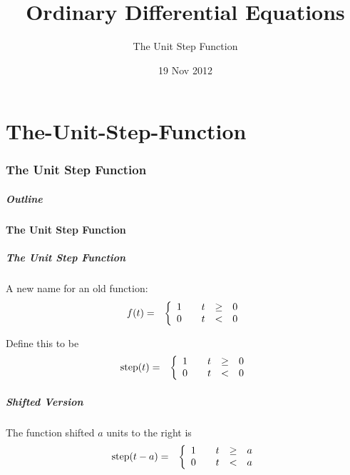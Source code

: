 \part{The-Unit-Step-Function}
\section{The Unit Step Function}

\title{Ordinary Differential Equations}
\subtitle{The Unit Step Function}
\date{19 Nov 2012}

\begin{frame}
  \titlepage
\end{frame}

\begin{frame}
  \frametitle{Outline}
\end{frame}


\subsection{The Unit Step Function}


\begin{frame}
  \frametitle{The Unit Step Function}

  A new name for an old function:
  \begin{eqnarray*}
    f(t) & = & 
    \left\{
      \begin{array}{r@{\hspace{2em}}rcl}
        1 & t & \geq & 0 \\
        0 & t & < & 0
      \end{array}
    \right.
  \end{eqnarray*}

  {
    Define this to be
    \begin{eqnarray*}
      \mathrm{step}(t) & = & 
      \left\{
        \begin{array}{r@{\hspace{2em}}rcl}
          1 & t & \geq & 0 \\
          0 & t & < & 0
        \end{array}
      \right.
    \end{eqnarray*}
  }

\end{frame}


\begin{frame}
  \frametitle{Shifted Version}

    The function shifted $a$ units to the right is
    \begin{eqnarray*}
      \mathrm{step}(t-a) & = & 
      \left\{
        \begin{array}{r@{\hspace{2em}}rcl}
          1 & t & \geq & a \\
          0 & t & < & a
        \end{array}
      \right.
    \end{eqnarray*}


\end{frame}

